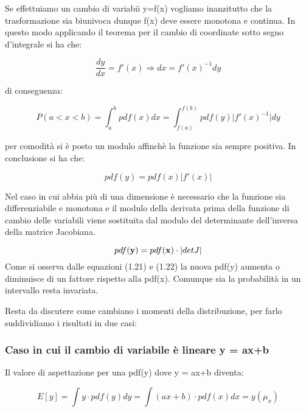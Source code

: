 \documentclass[11pt,a4paper]{book}
\begin{document}
Se effettuiamo un cambio di variabii y=f(x) vogliamo inanzitutto che la trasformazione sia biunivoca dunque f(x) deve essere monotona e continua. In questo modo applicando il teorema per il cambio di coordinate sotto segno d'integrale si ha che:

\begin{equation}
	\dfrac{dy}{dx} = f'(x) \Rightarrow dx = f'(x)^{-1}dy
\end{equation}

di conseguenza:

\begin{equation*}
	P(a < x< b) = \int_{a}^{b}{pdf(x)dx} = \int_{f(a)}^{f(b)}{pdf(y)\vert f'(x)^{-1}\vert dy}
\end{equation*}

per comodit\`{a} si \`{e} posto un modulo affinch\`{e} la funzione sia sempre positiva. In conclusione si ha che:

\begin{equation}
	pdf(y) = pdf(x)\vert f'(x) \vert
\end{equation}
 
 Nel caso in cui abbia pi\`{u} di una dimensione \`{e} necessario che la funzione sia differenziabile e monotona e il modulo della derivata prima della funzione di cambio delle variabili viene sostituita dal modulo del determinante dell'inversa della matrice Jacobiana.
 
 \begin{equation}
 	pdf(\bold{y}) = pdf(\bold{x}) \cdot \vert detJ \vert
 \end{equation}
\newline
\noindent Come si osserva dalle equazioni (1.21) e (1.22) la nuova pdf(y) aumenta o diminuisce di un fattore rispetto alla pdf(x). Comunque sia la probabilit\`{a} in un intervallo resta invariata.

Resta da discutere come cambiano i momenti della distribuzione, per farlo suddividiamo i risultati in due casi:

\subsubsection{Caso in cui il cambio di variabile \`{e} lineare y = ax+b}

Il valore di aspettazione per una pdf(y) dove y = ax+b diventa:

\begin{equation}
	E[y] = \int{y\cdot pdf(y)dy} = \int{(ax+b) \cdot pdf(x)dx = y(\mu_x)}
\end{equation}
 
\end{document}
